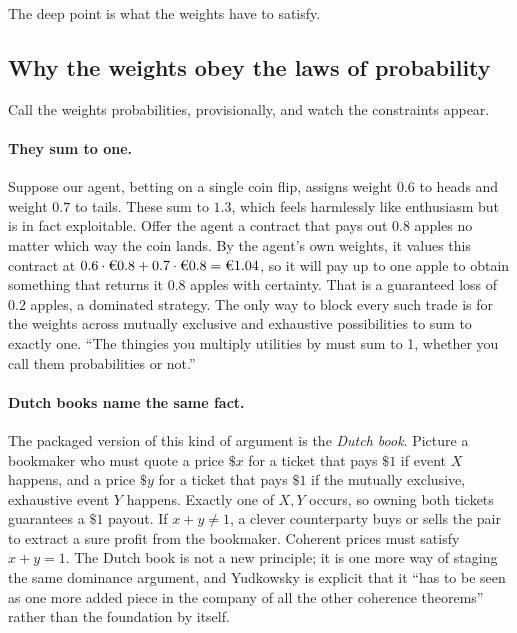 \documentclass[10pt]{article}
\theoremstyle{definition}
\theoremstyle{remark}
\newcommand{\util}[1]{\text{\texteuro}#1}
\begin{document}
The deep point is what the weights have to satisfy.

\subsection{Why the weights obey the laws of probability}

Call the weights probabilities, provisionally, and watch the constraints appear.

\paragraph{They sum to one.} Suppose our agent, betting on a single coin flip, assigns weight $0.6$ to heads and weight $0.7$ to tails. These sum to $1.3$, which feels harmlessly like enthusiasm but is in fact exploitable. Offer the agent a contract that pays out $0.8$ apples no matter which way the coin lands. By the agent's own weights, it values this contract at $0.6 \cdot \util{0.8} + 0.7 \cdot \util{0.8} = \util{1.04}$, so it will pay up to one apple to obtain something that returns it $0.8$ apples with certainty. That is a guaranteed loss of $0.2$ apples, a dominated strategy. The only way to block every such trade is for the weights across mutually exclusive and exhaustive possibilities to sum to exactly one. ``The thingies you multiply utilities by must sum to 1, whether you call them probabilities or not.''

\paragraph{Dutch books name the same fact.} The packaged version of this kind of argument is the \emph{Dutch book}. Picture a bookmaker who must quote a price $\$x$ for a ticket that pays $\$1$ if event $X$ happens, and a price $\$y$ for a ticket that pays $\$1$ if the mutually exclusive, exhaustive event $Y$ happens. Exactly one of $X, Y$ occurs, so owning both tickets guarantees a $\$1$ payout. If $x + y \ne 1$, a clever counterparty buys or sells the pair to extract a sure profit from the bookmaker. Coherent prices must satisfy $x + y = 1$. The Dutch book is not a new principle; it is one more way of staging the same dominance argument, and Yudkowsky is explicit that it ``has to be seen as one more added piece in the company of all the other coherence theorems'' rather than the foundation by itself.
\end{document}
